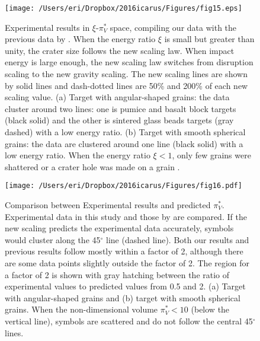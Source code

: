 \documentclass[3p,authoryear]{elsarticle}
\begin{document}
\begin{figure}[htbp]
	\centering
	\texttt{[image: /Users/eri/Dropbox/2016icarus/Figures/fig15.eps]}
	\caption{Experimental results in $\xi$-$\pi_V^*$ space, compiling our data with the previous data by \citet{schmidt1980, mizutani1983, cintala1999, yamamoto2006, guettler2012, holsapple2014}. When the energy ratio $\xi$ is small but greater than unity, the crater size follows the new scaling law. When impact energy is large enough, the new scaling law switches from disruption scaling to the new gravity scaling. The new scaling lines are shown by solid lines and dash-dotted lines are 50\% and 200\% of each new scaling value. (a) Target with angular-shaped grains: the data cluster around two lines: one is pumice and basalt block targets (black solid) and the other is sintered glass beads targets (gray dashed) with a low energy ratio. (b) Target with smooth spherical grains: the data are clustered around one line (black solid) with a low energy ratio. When the energy ratio $\xi<1$, only few grains were shattered or a crater hole was made on a grain \citep{guettler2012}.}
	\label{xi_vs_newpiV}
	\centering
\end{figure}

\begin{figure}[htbp]
	\centering
	\texttt{[image: /Users/eri/Dropbox/2016icarus/Figures/fig16.pdf]}
	\caption{Comparison between Experimental results and predicted $\pi_V^*$. Experimental data in this study and those by \citet{schmidt1980, mizutani1983, cintala1999, yamamoto2006, guettler2012, holsapple2014} are compared. If the new scaling predicts the experimental data accurately, symbols would cluster along the 45$^\circ$ line (dashed line). Both our results and previous results follow mostly within a factor of 2, although there are some data points slightly outside the factor of 2. The region for a factor of 2 is shown with gray hatching between the ratio of experimental values to predicted values from 0.5 and 2. (a) Target with angular-shaped grains and (b) target with smooth spherical grains. When the non-dimensional volume $\pi_V^*<10$ (below the vertical line), symbols are scattered and do not follow the central 45$^\circ$ lines.}
	\label{check-new-pi}
	\centering
\end{figure}
\end{document}
